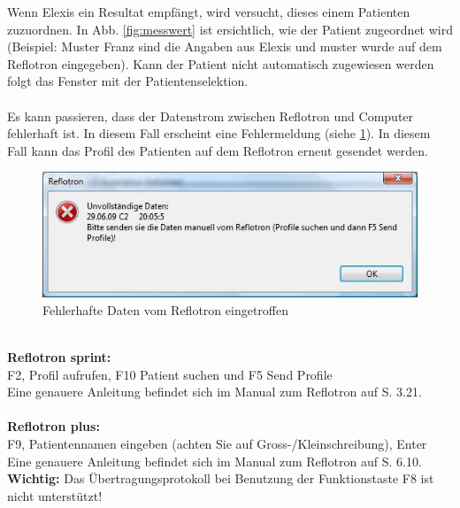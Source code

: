 \documentclass[a4paper]{scrartcl}
\begin{document}
Wenn Elexis ein Resultat empf\"angt, wird versucht, dieses einem Patienten zuzuordnen. In Abb. \ref{fig:messwert} ist ersichtlich, wie der Patient zugeordnet wird (Beispiel: Muster Franz sind die Angaben aus Elexis und muster wurde auf dem Reflotron eingegeben). Kann der Patient nicht automatisch zugewiesen werden folgt das Fenster mit der Patientenselektion.\\
\\
Es kann passieren, dass der Datenstrom zwischen Reflotron und Computer fehlerhaft ist. In diesem Fall erscheint eine Fehlermeldung (siehe \ref{fig:transmissionerror}). In diesem Fall kann das Profil des Patienten auf dem Reflotron erneut gesendet werden.\\
\begin{figure}[h]
    \includegraphics{transmissionerror}
    \caption{Fehlerhafte Daten vom Reflotron eingetroffen}
    \label{fig:transmissionerror}
\end{figure}
\\
\textbf{Reflotron sprint:}\\
F2, Profil aufrufen, F10 Patient suchen und F5 Send Profile\\
Eine genauere Anleitung befindet sich im Manual zum Reflotron auf S. 3.21.\\
\\
\textbf{Reflotron plus:}\\
F9, Patientennamen eingeben (achten Sie auf Gross-/Kleinschreibung), Enter\\
Eine genauere Anleitung befindet sich im Manual zum Reflotron auf S. 6.10.\\
\textbf{Wichtig:} Das \"Ubertragungsprotokoll bei Benutzung der Funktionstaste F8 ist nicht unterst\"utzt!\\
\\
\end{document}
